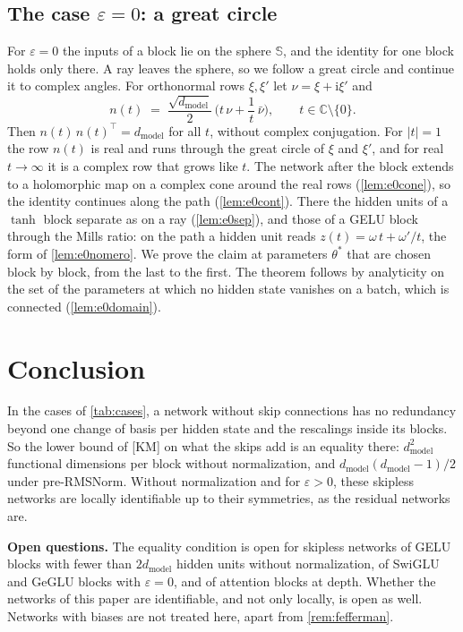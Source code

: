 \documentclass[10pt]{article}
\theoremstyle{definition}
\theoremstyle{remark}
\newcommand{\dm}{d_{\mathrm{model}}}
\newcommand{\para}[1]{\smallskip\noindent\textbf{#1}\hspace{0.5em}}
\begin{document}
\subsection{The case \texorpdfstring{$\varepsilon = 0$}{of no regularization}: a great circle}\label{sec:circle}

For $\varepsilon = 0$ the inputs of a block lie on the sphere $\mathbb S$, and the identity for one block holds only there. A ray leaves the sphere, so we follow a great circle and continue it to complex angles. For orthonormal rows $\xi, \xi'$ let $\nu = \xi + \mathrm i\xi'$ and
\[
n(t) \;=\; \frac{\sqrt{\dm}}{2}\,\Big(t\,\nu + \frac{1}{t}\,\bar\nu\Big), \qquad t \in \mathbb C\setminus\{0\}.
\]
Then $n(t)\,n(t)^\top = \dm$ for all $t$, without complex conjugation. For $\lvert t\rvert = 1$ the row $n(t)$ is real and runs through the great circle of $\xi$ and $\xi'$, and for real $t \to \infty$ it is a complex row that grows like $t$. The network after the block extends to a holomorphic map on a complex cone around the real rows (\cref{lem:e0cone}), so the identity continues along the path (\cref{lem:e0cont}). There the hidden units of a $\tanh$ block separate as on a ray (\cref{lem:e0sep}), and those of a GELU block through the Mills ratio: on the path a hidden unit reads $z(t) = \omega\,t + \omega'/t$, the form of \cref{lem:e0nomero}. We prove the claim at parameters $\theta^*$ that are chosen block by block, from the last to the first. The theorem follows by analyticity on the set of the parameters at which no hidden state vanishes on a batch, which is connected (\cref{lem:e0domain}).

\section{Conclusion}\label{sec:conclusion}

In the cases of \cref{tab:cases}, a network without skip connections has no redundancy beyond one change of basis per hidden state and the rescalings inside its blocks. So the lower bound of [KM] on what the skips add is an equality there: $\dm^2$ functional dimensions per block without normalization, and $\dm(\dm-1)/2$ under pre-RMSNorm. Without normalization and for $\varepsilon > 0$, these skipless networks are locally identifiable up to their symmetries, as the residual networks are.

\para{Open questions.} The equality condition is open for skipless networks of GELU blocks with fewer than $2\dm$ hidden units without normalization, of SwiGLU and GeGLU blocks with $\varepsilon = 0$, and of attention blocks at depth. Whether the networks of this paper are identifiable, and not only locally, is open as well. Networks with biases are not treated here, apart from \cref{rem:fefferman}.
\end{document}
